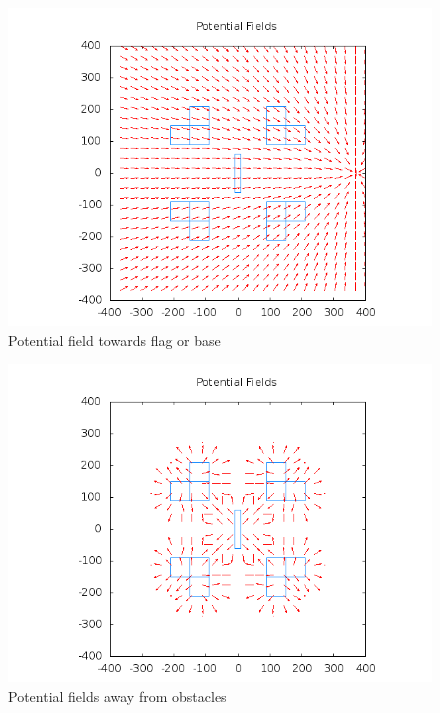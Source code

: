 \documentclass[11pt]{article}
\begin{document}
\begin{figure}[h]
	\caption{Potential field towards flag or base}
	\includegraphics[scale=.2]{plots/four_ls/pfFlag.png}
\end{figure}
\begin{figure}[h]
	\caption{Potential fields away from obstacles}
	\includegraphics[scale=.2]{plots/four_ls/pfObstacles.png}
\end{figure}
\end{document}

